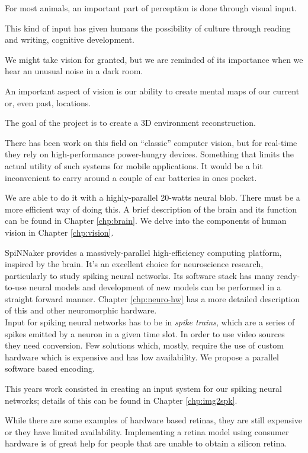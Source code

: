 For most animals, an important part of perception is done through visual input.

This kind of input has given humans the possibility of culture through reading and writing, cognitive development.

We might take vision for granted, but we are reminded of its importance when we hear an unusual noise in a dark room. 

An important aspect of vision is our ability to create mental maps of our current or, even past, locations.

The goal of the project is to create a 3D environment reconstruction.

There has been work on this field on ``classic'' computer vision, but for real-time they rely on high-performance power-hungry devices. Something that limits the actual utility of such systems for mobile applications. It would be a bit inconvenient to carry around a couple of car batteries in ones pocket.

We are able to do it with a highly-parallel 20-watts neural blob. There must be a more efficient way of doing this. A brief description of the brain and its function can be found in Chapter \ref{chp:brain}. We delve into the components of human vision in Chapter \ref{chp:vision}.

SpiNNaker provides a massively-parallel high-efficiency computing platform, inspired by the brain. It's an excellent choice for neuroscience research, particularly to study spiking neural networks. Its software stack has many ready-to-use neural models and development of new models can be performed in a straight forward manner. Chapter \ref{chp:neuro-hw} has a more detailed description of this and other neuromorphic hardware.\\


Input for spiking neural networks has to be in \emph{spike trains}, which are a series of spikes emitted by a neuron in a given time slot. In order to use video sources they need conversion. Few solutions which, mostly, require the use of custom hardware which is expensive and has low availability. We propose a parallel software based encoding.

This years work consisted in creating an input system for our spiking neural networks; details of this can be found in Chapter \ref{chp:img2spk}. 

While there are some examples of hardware based retinas, they are still expensive or they have limited availability. Implementing a retina model using consumer hardware is of great help for people that are unable to obtain a silicon retina.

